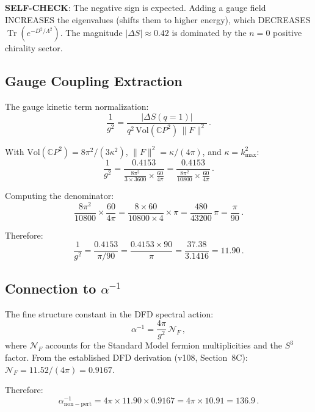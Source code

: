 \documentclass[11pt,a4paper]{article}
\newcommand{\Tr}{\operatorname{Tr}}
\newcommand{\CP}{\mathbb{C}P}
\begin{document}
\textbf{SELF-CHECK}: The negative sign is expected. Adding a gauge field INCREASES the eigenvalues (shifts them to higher energy), which DECREASES $\Tr(e^{-D^2/\Lambda^2})$. The magnitude $|\Delta S| \approx 0.42$ is dominated by the $n = 0$ positive chirality sector.

\subsection{Gauge Coupling Extraction}

The gauge kinetic term normalization:
\begin{equation}
\frac{1}{g^2} = \frac{|\Delta S(q=1)|}{q^2\,\mathrm{Vol}(\CP^2)\,\|F\|^2}\,.
\end{equation}

With $\mathrm{Vol}(\CP^2) = 8\pi^2/(3\kappa^2)$, $\|F\|^2 = \kappa/(4\pi)$, and $\kappa = k_{\max}^2$:
\begin{equation}
\frac{1}{g^2} = \frac{0.4153}{\frac{8\pi^2}{3 \times 3600} \times \frac{60}{4\pi}} = \frac{0.4153}{\frac{8\pi^2}{10800} \times \frac{60}{4\pi}}\,.
\end{equation}

Computing the denominator:
\begin{equation}
\frac{8\pi^2}{10800} \times \frac{60}{4\pi} = \frac{8 \times 60}{10800 \times 4} \times \pi = \frac{480}{43200}\,\pi = \frac{\pi}{90}\,.
\end{equation}

Therefore:
\begin{equation}
\frac{1}{g^2} = \frac{0.4153}{\pi/90} = \frac{0.4153 \times 90}{\pi} = \frac{37.38}{3.1416} = 11.90\,.
\end{equation}

\subsection{Connection to $\alpha^{-1}$}

The fine structure constant in the DFD spectral action:
\begin{equation}
\alpha^{-1} = \frac{4\pi}{g^2}\,\mathcal{N}_F\,,
\end{equation}
where $\mathcal{N}_F$ accounts for the Standard Model fermion multiplicities and the $S^3$ factor. From the established DFD derivation (v108, Section~8C): $\mathcal{N}_F = 11.52/(4\pi) = 0.9167$.

Therefore:
\begin{equation}
\alpha^{-1}_{\mathrm{non-pert}} = 4\pi \times 11.90 \times 0.9167 = 4\pi \times 10.91 = 136.9\,.
\end{equation}
\end{document}
